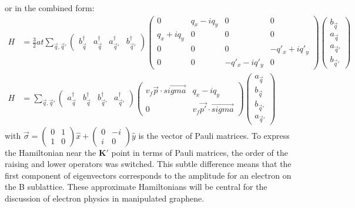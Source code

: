 or in the combined form:
\begin{align}
	H&=\frac{3}{2} a t \sum_{\vec q, \vec{q}'}
		\left( \begin{array}{cccc} b^{\dagger}_{\vec{q}} & a^{\dagger}_{\vec{q}} & a^{\dagger}_{\vec{q}'} & b^{\dagger}_{\vec{q}'}
																							\end{array} \right)
		\left( \begin{array}{cccc}
			0              & q_x - i q_y & 0            & 0 \\
			q_x+i q_y      & 0           & 0            & 0 \\                            
			0              & 0           & 0            & -q'_x+i q'_y \\
			0              & 0           & -q'_x-i q'_y & 0			            			\end{array} \right)
		\left( \begin{array}{c } b_{\vec{q}} \\ a_{\vec{q}} \\ a_{\vec{q}'} \\ b_{\vec{q}'}  \end{array} \right) \\
	H&=\sum_{\vec q, \vec{q}'}
		\left( \begin{array}{cccc}  a^{\dagger}_{\vec{q}} & b^{\dagger}_{\vec{q}}&  b^{\dagger}_{\vec{q}'} & a^{\dagger}_{\vec{q}'}
																							\end{array} \right)
		\left( \begin{array}{cc}
			v_f \vec{p} \cdot \vec{sigma}              & q_x - i q_y\\
			0              & v_f \vec{p'} \cdot \vec{sigma}			   	            			\end{array} \right)
		\left( \begin{array}{c }  a_{\vec{q}} \\ b_{\vec{q}} \\  b_{\vec{q}'} \\ a_{\vec{q}'} \end{array} \right)
	\label{eq:TB:FullH}
\end{align}
with $\vec{\sigma}= \left( \begin{array}{cc} 0 & 1 \\ 1 & 0 \end{array} \right) \hat{x}+\left( \begin{array}{cc} 0 & -i \\ i & 0 \end{array} \right) \hat{y}$ is the vector of Pauli matrices.
To express the Hamiltonian near the $\bm{K'}$ point in terms of Pauli matrices, the order of the raising and lower operators was switched.
This subtle difference means that the first component of eigenvectors corresponds to the amplitude for an electron on the B sublattice.
These approximate Hamiltonians will be central for the discussion of electron physics in manipulated graphene.

